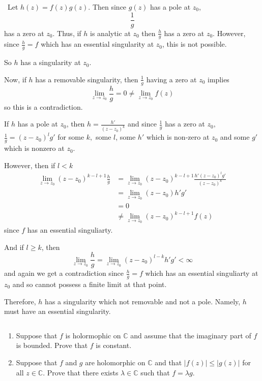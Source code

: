 \documentclass[12pt]{Qual}
\begin{document}
\begin{solution}$\,$
Let $h(z)=f(z)g(z)$. Then since $g(z)$ has a pole at $z_0$, $$\frac{1}{g}$$ has a zero at $z_0$. Thus, if $h$ is analytic at $z_0$ then $\frac{h}{g}$ has a zero at $z_0$. However, since $\frac{h}{g}=f$ which has an essential singularity at $z_0$, this is not possible.

So $h$ has a singularity at $z_0.$

Now, if $h$ has a removable singularity, then $\frac{1}{g}$ having a zero at $z_0$ implies $$\lim_{z\to z_0}\frac{h}{g}=0\not=\lim_{z\to z_0}f(z)$$ so this is a contradiction.

If $h$ has a pole at $z_0$, then $h=\frac{h'}{(z-z_0)^k}$ and since $\frac{1}{g}$ has a zero at $z_0,$ $\frac{1}{g}=(z-z_0)^lg'$ for some $k,$ some $l$, some $h'$ which is non-zero at $z_0$ and some $g'$ which is nonzero at $z_0$.

However, then if $l<k$ \begin{align*}
    \lim_{z\to z_0}(z-z_0)^{k-l+1}\frac{h}{g}&=\lim_{z\to z_0}(z-z_0)^{k-l+1}\frac{h'(z-z_0)^lg'}{(z-z_0)^k}\\
    &=\lim_{z\to z_0}(z-z_0)h'g'\\
    &=0\\
    &\not=\lim_{z\to z_0}(z-z_0)^{k-l+1}f(z)
\end{align*} since $f$ has an essential singuliarty.

And if $l\ge k$, then $$\lim_{z\to z_0}\frac{h}{g}=\lim_{z\to z_0}(z-z_0)^{l-k}h'g'<\infty$$ and again we get a contradiction since $\frac{h}{g}=f$ which has an essential singuliarty at $z_0$ and so cannot possess a finite limit at that point.

Therefore, $h$ has a singularity which not removable and not a pole. Namely, $h$ must have an essential singularity.
\end{solution}
\newpage





\begin{problem} $\,$
\begin{enumerate}[label=(\alph*)]
    \item Suppose that $f$ is holormophic on $\mathbb{C}$ and assume that the imaginary part of $f$ is bounded. Prove that $f$ is constant.
    \item Suppose that $f$ and $g$ are holomorphic on $\mathbb{C}$ and that $|f(z)|\le|g(z)|$ for all $z\in\mathbb{C}$. Prove that there exists $\lambda\in\mathbb{C}$ such that $f=\lambda g$.
\end{enumerate}
\end{problem}
\end{document}
